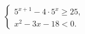 \begin{ex}[type=ineq_system]
	\begin{condition}
		\( \left\{
		\begin{array}{l}
			5^{x+1}-4\cdot5^x\ge25,\\
			x^2-3x-18<0.
		\end{array}
		\right. \)
	\end{condition}
	\answer{\( [2;6) \)}
\end{ex}